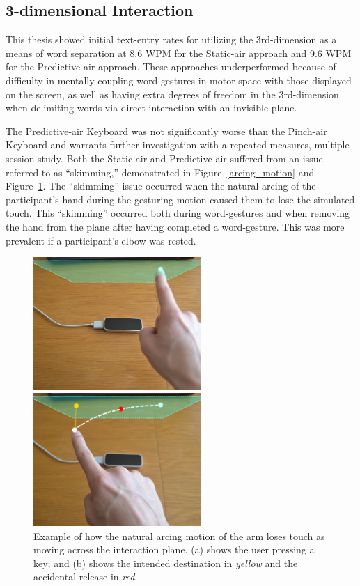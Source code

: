 \subsection{3-dimensional Interaction}
This thesis showed initial text-entry rates for utilizing the 3rd-dimension as a means of word separation at 8.6 WPM for the Static-air approach and 9.6 WPM for the Predictive-air approach. These approaches underperformed because of difficulty in mentally coupling word-gestures in motor space with those displayed on the screen, as well as having extra degrees of freedom in the 3rd-dimension when delimiting words via direct interaction with an invisible plane.

The Predictive-air Keyboard was not significantly worse than the Pinch-air Keyboard and warrants further investigation with a repeated-measures, multiple session study. Both the Static-air and Predictive-air suffered from an issue referred to as ``skimming,'' demonstrated in Figure~\ref{arcing_motion} and Figure~\ref{skimming_problem}. The ``skimming'' issue occurred when the natural arcing of the participant's hand during the gesturing motion caused them to lose the simulated touch. This ``skimming'' occurred both during word-gestures and when removing the hand from the plane after having completed a word-gesture. This was more prevalent if a participant's elbow was rested.

\begin{figure}[!t]
	\centering
	\begin{minipage}[t]{2.5in}
		\includegraphics[width=2.5in]{Figures/fig_skimming_before}
	\end{minipage}
	\begin{minipage}[t]{2.5in}
		\includegraphics[width=2.5in]{Figures/fig_skimming_after}
	\end{minipage}
	\caption[``Skimming'' Problem]{Example of how the natural arcing motion of the arm loses touch as moving across the interaction plane. (a) shows the user pressing a key; and (b) shows the intended destination in \textit{yellow} and the accidental release in \textit{red}.}
	\label{skimming_problem}
\end{figure}

